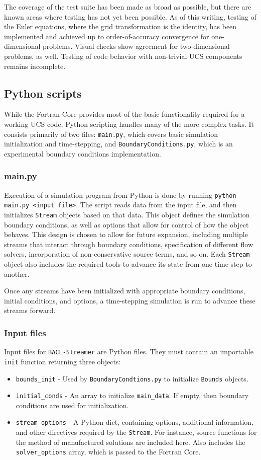 The coverage of the test suite has been made as broad as possible, but there are known areas where testing has not yet been possible. As of this writing, testing of the Euler equations, where the grid transformation is the identity, has been implemented and achieved up to order-of-accuracy convergence for one-dimensional problems. Visual checks show agreement for two-dimensional problems, as well. Testing of code behavior with non-trivial UCS components remains incomplete.

\subsection{Python scripts}

While the Fortran Core provides most of the basic functionality required for a working UCS code, Python scripting handles many of the more complex tasks. It consists primarily of two files: {\tt main.py}, which covers basic simulation initialization and time-stepping, and {\tt BoundaryConditions.py}, which is an experimental boundary conditions implementation. 

\subsubsection{main.py}
Execution of a simulation program from Python is done by running {\tt python main.py <input file>}. The script reads data from the input file, and then initializes {\tt Stream} objects based on that data. This object defines the simulation boundary conditions, as well as options that allow for control of how the object behaves. This design is chosen to allow for future expansion, including multiple streams that interact through boundary conditions, specification of different flow solvers, incorporation of non-conservative source terms, and so on. Each {\tt Stream} object also includes the required tools to advance its state from one time step to another.

Once any streams have been initialized with appropriate boundary conditions, initial conditions, and options, a time-stepping simulation is run to advance these streams forward. 

\subsubsection{Input files}
Input files for {\tt BACL-Streamer} are Python files. They must contain an importable {\tt init} function returning three objects:
\begin{itemize}
\item {\tt bounds\_init} - Used by {\tt BoundaryCondtions.py} to initialize {\tt Bounds} objects.
\item {\tt initial\_conds} - An array to initialize {\tt main\_data}. If empty, then boundary conditions are used for initialization.
\item {\tt stream\_options} - A Python dict, containing options, additional information, and other directives required by the {\tt Stream}. For instance, source functions for the method of manufactured solutions are included here. Also includes the {\tt solver\_options} array, which is passed to the Fortran Core.
\end{itemize}

